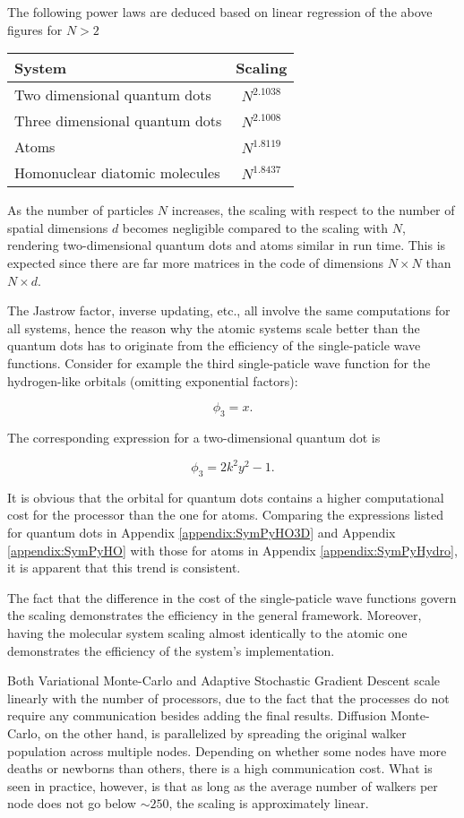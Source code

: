 The following power laws are deduced based on linear regression of the above figures for $N > 2$

\begin{tabular}{l|c}
System & Scaling \\
\hline
Two dimensional quantum dots & $N^{2.1038}$ \\
Three dimensional quantum dots & $N^{2.1008}$ \\
Atoms & $N^{1.8119}$ \\
Homonuclear diatomic molecules & $N^{1.8437}$ \\ 
\end{tabular}


As the number of particles $N$ increases, the scaling with respect to the number of spatial dimensions $d$ becomes negligible compared to the scaling with $N$, rendering two-dimensional quantum dots and atoms similar in run time. This is expected since there are far more matrices in the code of dimensions $N\times N$ than $N \times d$. 

The Jastrow factor, inverse updating, etc., all involve the same computations for all systems, hence the reason why the atomic systems scale better than the quantum dots has to originate from the efficiency of the single-paticle wave functions. Consider for example the third single-paticle wave function for the hydrogen-like orbitals (omitting exponential factors):

\begin{equation}
 \phi_3 = x.
\end{equation}

The corresponding expression for a two-dimensional quantum dot is

\begin{equation}
  \phi_3 = 2k^2y^2 - 1.
\end{equation}

It is obvious that the orbital for quantum dots contains a higher computational cost for the processor than the one for atoms. Comparing the expressions listed for quantum dots in Appendix \ref{appendix:SymPyHO3D} and Appendix \ref{appendix:SymPyHO} with those for atoms in Appendix \ref{appendix:SymPyHydro}, it is apparent that this trend is consistent.

The fact that the difference in the cost of the single-paticle wave functions govern the scaling demonstrates the efficiency in the general framework. Moreover, having the molecular system scaling almost identically to the atomic one demonstrates the efficiency of the system's implementation. 

Both Variational Monte-Carlo and Adaptive Stochastic Gradient Descent scale linearly with the number of processors, due to the fact that the processes do not require any communication besides adding the final results. Diffusion Monte-Carlo, on the other hand, is parallelized by spreading the original walker population across multiple nodes. Depending on whether some nodes have more deaths or newborns than others, there is a high communication cost. What is seen in practice, however, is that as long as the average number of walkers per node does not go below $\sim250$, the scaling is approximately linear. 




